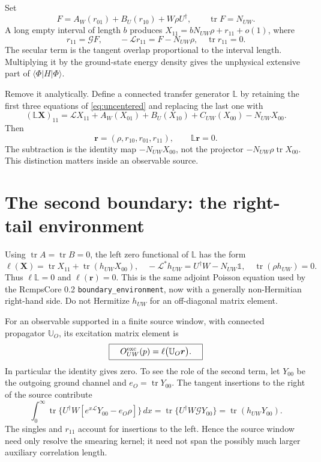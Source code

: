 \documentclass[11pt]{article}
\newcommand{\tr}{\operatorname{tr}}
\newcommand{\Id}{\mathbb{1}}
\newcommand{\LL}{\mathcal{L}}
\newcommand{\GG}{\mathcal{G}}
\newcommand{\ket}[1]{\lvert #1\rangle}
\newcommand{\bra}[1]{\langle #1\rvert}
\begin{document}
Set
\begin{equation}
 F=A_W(r_{01})+B_U(r_{10})+W\rho U^\dagger,
 \qquad \tr F=N_{UW}.
\end{equation}
A long empty interval of length $b$ produces
$X_{11}=bN_{UW}\rho+r_{11}+o(1)$, where
\begin{equation}
 r_{11}=\GG F,\qquad
 -\LL r_{11}=F-N_{UW}\rho,\quad \tr r_{11}=0.
 \label{eq:double}
\end{equation}
The secular term is the tangent overlap proportional to the interval length.
Multiplying it by the ground-state energy density gives the unphysical
extensive part of $\bra{\Phi}H\ket{\Phi}$.

Remove it analytically. Define a connected transfer generator $\mathbb L$
by retaining the first three equations of \eqref{eq:uncentered} and replacing
the last one with
\begin{equation}
 (\mathbb L\bm X)_{11}=\LL X_{11}+A_W(X_{01})+B_U(X_{10})
                         +C_{UW}(X_{00})-N_{UW}X_{00}.
 \label{eq:connected}
\end{equation}
Then
\begin{equation}
 \bm r=(\rho,r_{10},r_{01},r_{11}),\qquad \mathbb L\bm r=0.
\end{equation}
The subtraction is the identity map $-N_{UW}X_{00}$, not the projector
$-N_{UW}\rho\tr X_{00}$. This distinction matters inside an observable source.

\section{The second boundary: the right-tail environment}
Using $\tr A=\tr B=0$, the left zero functional of $\mathbb L$ has the form
\begin{equation}
 \ell(\bm X)=\tr X_{11}+\tr(h_{UW}X_{00}),
 \quad
 -\LL^*h_{UW}=U^\dagger W-N_{UW}\Id,
 \quad \tr(\rho h_{UW})=0.
 \label{eq:left}
\end{equation}
Thus $\ell\mathbb L=0$ and $\ell(\bm r)=0$. This is the same adjoint Poisson
equation used by the RcmpsCore 0.2 \texttt{boundary\_environment}, now with a
generally non-Hermitian right-hand side. Do not Hermitize $h_{UW}$ for
an off-diagonal matrix element.

For an observable supported in a finite source window, with connected
propagator $\mathbb U_O$, its excitation matrix element is
\begin{equation}
 \boxed{\quad O^{\rm exc}_{UW}(p)=\ell\bigl(\mathbb U_O\bm r\bigr).\quad}
 \label{eq:observable}
\end{equation}
In particular the identity gives zero. To see the role of the second term,
let $Y_{00}$ be the outgoing ground channel and $e_O=\tr Y_{00}$.
The tangent insertions to the right of the source contribute
\begin{equation}
 \int_0^\infty \tr\{U^\dagger W
          [e^{x\LL}Y_{00}-e_O\rho]\}\,dx
 =\tr\{U^\dagger W\GG Y_{00}\}
 =\tr(h_{UW}Y_{00}).
\end{equation}
The singles and $r_{11}$ account for insertions to the left. Hence the
source window need only resolve the smearing kernel; it need not span the
possibly much larger auxiliary correlation length.
\end{document}

